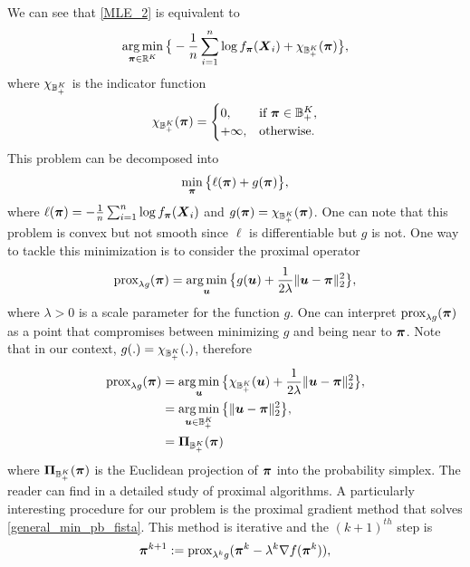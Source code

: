We can see that \cref{MLE_2} is equivalent to
\begin{equation}
\operatorname*{arg\,min}_{\boldsymbol \pi\in{\mathbb R}^K}\big\{-\frac{1}{n}\sum_{i=1}^n\log f_{\boldsymbol \pi}(\boldsymbol X_i)+\chi_{{\mathbb B}_+^K}(\boldsymbol \pi)\big\},
\end{equation}
where $\chi_{{\mathbb B}_+^K}$ is the indicator function
\begin{equation*}
    \chi_{{\mathbb B}_+^K}(\boldsymbol \pi) =
    \begin{cases}
      0, & \text{if } \boldsymbol \pi\in {\mathbb B}_+^K,\\
      +\infty, & \text{otherwise} .
    \end{cases}
\end{equation*}
This problem can be decomposed into 
\begin{equation}
\label{general_min_pb_fista}
    \min_{\boldsymbol \pi}\big\{\ell(\boldsymbol \pi)+g(\boldsymbol \pi)\big\},
\end{equation}
where $\ell(\boldsymbol \pi) =-\frac{1}{n}\sum_{i=1}^n\log f_{\boldsymbol \pi}(\boldsymbol X_i)$ and $g(\boldsymbol \pi)=\chi_{{\mathbb B}_+^K}(\boldsymbol \pi)$. One can note that this problem is convex but not smooth since $\ell$ is differentiable but $g$ is not. One way to tackle this minimization is to consider the proximal operator
\begin{equation}
    \textnormal{prox}_{\lambda g}(\boldsymbol \pi) = \operatorname*{arg\,min}_{\boldsymbol u}\big\{g(\boldsymbol u)+\frac{1}{2\lambda}\|\boldsymbol u-\boldsymbol \pi\|^2_2\big\},
\end{equation}
where $\lambda > 0$ is a scale parameter for the function $g$. One can interpret $\textnormal{prox}_{\lambda g}(\boldsymbol \pi)$ as a point that compromises between minimizing $g$ and being near to $\boldsymbol \pi$. Note that in our context, $g(.)=\chi_{{\mathbb B}_+^K}(.)$, therefore
\begin{align*}
    \textnormal{prox}_{\lambda g}(\boldsymbol \pi) &= \operatorname*{arg\,min}_{\boldsymbol u}\big\{\chi_{{\mathbb B}_+^K}(\boldsymbol u)+\frac{1}{2\lambda}\|\boldsymbol u-\boldsymbol \pi\|^2_2\big\},\\
    &= \operatorname*{arg\,min}_{\boldsymbol u\in {\mathbb B}_+^K}\big\{\|\boldsymbol u-\boldsymbol \pi\|^2_2\big\},\\
    &= \boldsymbol\Pi_{{\mathbb B}_+^K}(\boldsymbol \pi)
\end{align*}
where $\boldsymbol\Pi_{{\mathbb B}_+^K}(\boldsymbol \pi)$ is the Euclidean projection of $\boldsymbol \pi$ into the probability simplex. The reader can find in \citep{Parikh:2014:PA:2693612.2693613} a detailed study of proximal algorithms. A particularly interesting procedure for our problem is the proximal gradient method that solves \cref{general_min_pb_fista}. This method is iterative and the $(k+1)^{th}$ step is
\begin{equation}
    \boldsymbol \pi^{k+1} := \textnormal{prox}_{\lambda^k g}(\boldsymbol \pi^k-\lambda^k\nabla f(\boldsymbol \pi^k)),
\end{equation}

